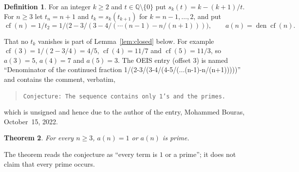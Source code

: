 \documentclass[11pt]{amsart}
\theoremstyle{plain}
\newtheorem{theorem}{Theorem}
\theoremstyle{definition}
\newtheorem{definition}[theorem]{Definition}
\newcommand{\Q}{\mathbb{Q}}
\DeclareMathOperator{\den}{den}
\DeclareMathOperator{\cf}{cf}
\begin{document}
\begin{definition}\label{def:a}
For an integer $k\ge2$ and $t\in\Q\setminus\{0\}$ put $s_k(t)=k-(k+1)/t$. For $n\ge3$ let $t_n=n+1$ and $t_k=s_k(t_{k+1})$ for $k=n-1,\dots,2$, and put
\[
  \cf(n)=1/t_2=1/\bigl(2-3/(3-4/(\cdots(n-1)-n/(n+1)))\bigr),\qquad a(n)=\den\cf(n).
\]
\end{definition}

That no $t_k$ vanishes is part of Lemma~\ref{lem:closed} below. For example $\cf(3)=1/(2-3/4)=4/5$, $\cf(4)=11/7$ and $\cf(5)=11/3$, so $a(3)=5$, $a(4)=7$ and $a(5)=3$.
The OEIS entry \cite{A356360} (offset $3$) is named ``Denominator of the continued fraction 1/(2-3/(3-4/(4-5/(...(n-1)-n/(n+1)))))'' and contains the comment, verbatim,
\begin{quote}
\texttt{Conjecture: The sequence contains only 1's and the primes.}
\end{quote}
which is unsigned and hence due to the author of the entry, Mohammed Bouras, October~15, 2022.

\begin{theorem}\label{thm:main}
For every $n\ge3$, $a(n)=1$ or $a(n)$ is prime.
\end{theorem}

The theorem reads the conjecture as ``every term is $1$ or a prime''; it does not claim that every prime occurs.
\end{document}
